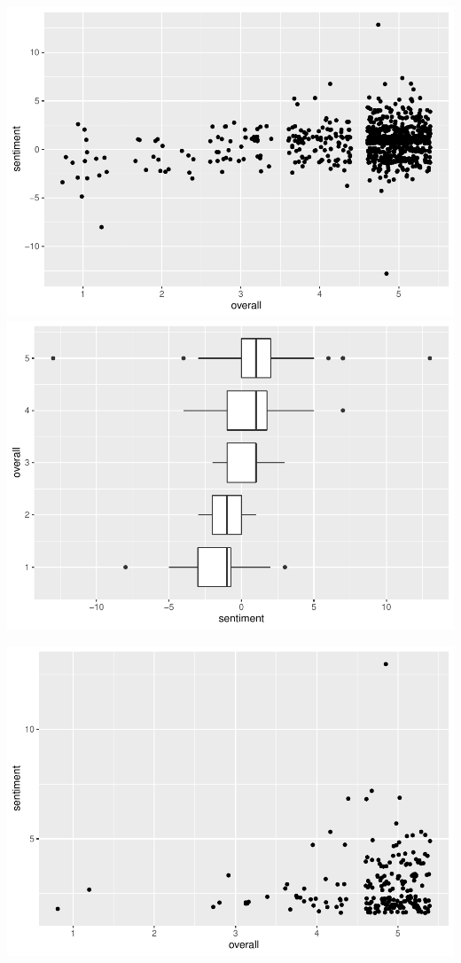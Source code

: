 \documentclass[
  11pt,
]{article}
\begin{document}
\includegraphics{Assignment-STAT702_files/figure-latex/sentiment_plot-4.pdf}
\includegraphics{Assignment-STAT702_files/figure-latex/sentiment_plot-5.pdf}

\includegraphics{Assignment-STAT702_files/figure-latex/top100_positive-1.pdf}
\end{document}

